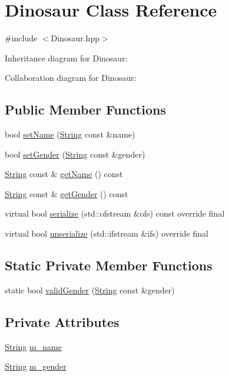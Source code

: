 \hypertarget{classDinosaur}{}\section{Dinosaur Class Reference}
\label{classDinosaur}


{\ttfamily \#include $<$Dinosaur.\+hpp$>$}



Inheritance diagram for Dinosaur\+:


Collaboration diagram for Dinosaur\+:
\subsection*{Public Member Functions}
\begin{DoxyCompactItemize}
\item 
bool \hyperlink{classDinosaur_a2f7fcf6777178a077176140f9ce024c5}{set\+Name} (\hyperlink{classString}{String} const \&name)
\item 
bool \hyperlink{classDinosaur_a7fa4a358709db5379e21065b050a6e1c}{set\+Gender} (\hyperlink{classString}{String} const \&gender)
\item 
\hyperlink{classString}{String} const  \& \hyperlink{classDinosaur_a9ee70963c582cdba5f502f238eeaf2ed}{get\+Name} () const
\item 
\hyperlink{classString}{String} const  \& \hyperlink{classDinosaur_ad0c54cc970fc58243d2815250ec758c1}{get\+Gender} () const
\item 
virtual bool \hyperlink{classDinosaur_a9dc25dc1d834210d869641893695de22}{serialize} (std\+::ofstream \&ofs) const override final
\item 
virtual bool \hyperlink{classDinosaur_aa84990b3102df65a9573117dec077518}{unserialize} (std\+::ifstream \&ifs) override final
\end{DoxyCompactItemize}
\subsection*{Static Private Member Functions}
\begin{DoxyCompactItemize}
\item 
static bool \hyperlink{classDinosaur_ac307419cb074f2919f76abdf0e0c2b3e}{valid\+Gender} (\hyperlink{classString}{String} const \&gender)
\end{DoxyCompactItemize}
\subsection*{Private Attributes}
\begin{DoxyCompactItemize}
\item 
\hyperlink{classString}{String} \hyperlink{classDinosaur_a831287eff2c7e12fb223bc417a03a28b}{m\+\_\+name}
\item 
\hyperlink{classString}{String} \hyperlink{classDinosaur_a62c9e910de13f41b3c536d1f05360e88}{m\+\_\+gender}
\end{DoxyCompactItemize}
